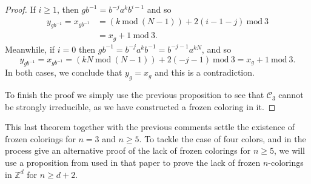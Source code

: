 \documentclass[cupthm,crop,info]{CUP-JNL-ETS}%
\theoremstyle{cupplain}
\theoremstyle{cupdefinition}
\theoremstyle{cupremark}
\theoremstyle{cupproof}
\newtheorem{proof}{Proof}
\numberwithin{equation}{section}
\begin{document}
\begin{proof}
If $i\ge 1$, then $gb^{-1}=b^{-j}a^kb^{i-1}$ and so
\begin{align*}
y_{gb^{-1}}=x_{gb^{-1}}&=(k\ \mathrm{mod}\ (N-1))+2(i-1-j)\ \mathrm{mod}\ 3\\
&=x_g+1\ \mathrm{mod}\ 3.
\end{align*}
Meanwhile, if $i=0$ then $gb^{-1}=b^{-j}a^kb^{-1}=b^{-j-1}a^{kN}$, and so
$$
y_{gb^{-1}}=x_{gb^{-1}}=(kN \ \mathrm{mod}\ (N-1))+2(-j-1)\ \mathrm{mod}\ 3=x_{g}+1\ \mathrm{mod}\ 3.
$$
	In both cases, we conclude that $y_g=x_g$ and this is a contradiction.


	To finish the proof we simply use the previous proposition to see that $\mathcal{C}_3$ cannot be strongly irreducible, as we have constructed a frozen coloring in it.
\end{proof}

This last theorem together with the previous comments settle the existence of frozen colorings for $n=3$ and $n\ge 5$. To tackle the case of four colors, and in the process give an alternative proof of the lack of frozen colorings for $n\ge 5$, we will use a proposition from \cite{alon2019mixing} used in that paper to prove the lack of frozen $n$-colorings in $\mathbb{Z}^d$ for $n\ge d+2$.
\end{document}
